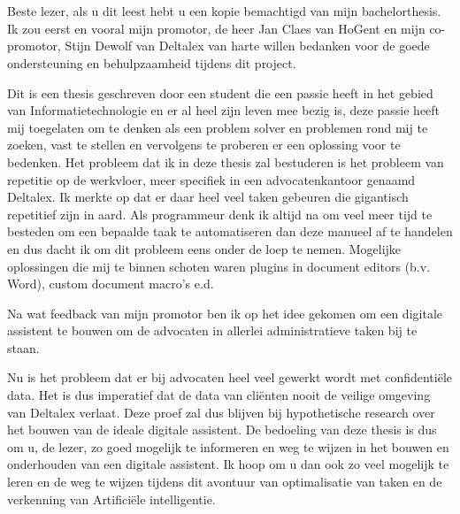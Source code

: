
\chapter*{}%
\label{ch:voorwoord}


Beste lezer, als u dit leest hebt u een kopie bemachtigd van mijn bachelorthesis. 
Ik zou eerst en vooral mijn promotor, de heer Jan Claes van HoGent en mijn co-promotor, Stijn Dewolf van Deltalex van harte willen bedanken voor de goede ondersteuning en behulpzaamheid tijdens dit project. 


Dit is een thesis geschreven door een student die een passie heeft in het gebied van Informatietechnologie en er al heel zijn leven mee bezig is, deze passie heeft mij toegelaten om te denken als een 
problem solver en problemen rond mij te zoeken, vast te stellen en vervolgens te proberen er een oplossing voor te bedenken. 
Het probleem dat ik in deze thesis zal bestuderen is het probleem van repetitie op de werkvloer, meer specifiek in een advocatenkantoor genaamd Deltalex. 
Ik merkte op dat er daar heel veel taken gebeuren die gigantisch repetitief zijn in aard. 
Als programmeur denk ik altijd na om veel meer tijd te besteden om een bepaalde taak te automatiseren dan deze manueel af te handelen en dus dacht ik om dit probleem eens onder de loep te nemen. 
Mogelijke oplossingen die mij te binnen schoten waren plugins in document editors (b.v. Word), custom document macro's e.d. 

Na wat feedback van mijn promotor ben ik op het idee gekomen om een digitale assistent te bouwen om de advocaten in allerlei administratieve taken bij te staan. 

Nu is het probleem dat er bij advocaten heel veel gewerkt wordt met confidentiële data. 
Het is dus imperatief dat de data van cliënten nooit de veilige omgeving van Deltalex verlaat. 
Deze proef zal dus blijven bij hypothetische research over het bouwen van de ideale digitale assistent. 
De bedoeling van deze thesis is dus om u, de lezer, zo goed mogelijk te informeren en weg te wijzen in het bouwen en onderhouden van een digitale assistent. 
Ik hoop om u dan ook zo veel mogelijk te leren en de weg te wijzen tijdens dit avontuur van optimalisatie van taken en de verkenning van Artificiële intelligentie. 
